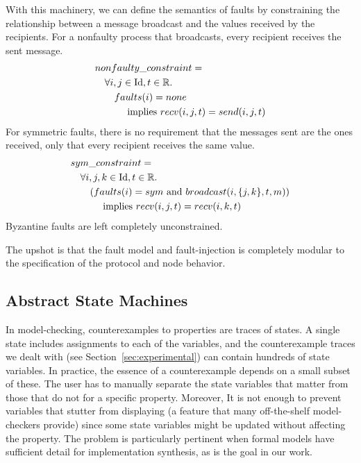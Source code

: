 \documentclass{llncs/llncs}
\newcommand{\Id}{\ensuremath{\mathrm{Id}}}
\begin{document}
With this machinery, we can define the semantics of faults by constraining the relationship between a message broadcast and the values received by the recipients. For a nonfaulty process that broadcasts, every recipient receives the sent message.
\begin{align*}
&nonfaulty\_constraint =\\
  &\quad \forall i, j \in \Id, t \in \mathbb{R}.\\
  &\quad\quad faults(i) = none\\
  &\quad\quad\quad \textnormal{ implies } recv(i, j, t) = send(i, j, t)
\end{align*}
\noindent
For symmetric faults, there is no requirement that the messages sent are the ones received, only that every recipient receives the same value.
\begin{align*}
&sym\_constraint =\\
  &\quad \forall i, j, k \in \Id, t \in \mathbb{R}.\\
  &\quad\quad (faults(i) = sym \textnormal{ and } broadcast(i, \{j, k\}, t, m))\\
  &\quad\quad\quad \textnormal{ implies } recv(i, j, t) = recv(i, k, t)
\end{align*}
\noindent
Byzantine faults are left completely unconstrained.

The upshot is that the fault model and fault-injection is completely modular to the specification of the protocol and node behavior.

\subsection{Abstract State Machines}\label{sec:abstract}\label{sec:asms}
In model-checking, counterexamples to properties are traces of states. A single state includes assignments to each of the variables, and the counterexample traces we dealt with (see Section~\ref{sec:experimental}) can contain hundreds of state variables. In practice, the essence of a counterexample depends on a small subset of these. The user has to manually separate the state variables that matter from those that do not for a specific property. Moreover, It is not enough to prevent variables that stutter from displaying (a feature that many off-the-shelf model-checkers provide) since some state variables might be updated without affecting the property. The problem is particularly pertinent when formal models have sufficient detail for implementation synthesis, as is the goal in our work.
\end{document}
